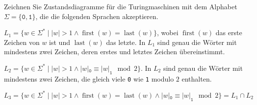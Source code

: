 Zeichnen Sie Zustandsdiagramme für die Turingmaschinen
mit dem Alphabet $\Sigma=\{\texttt{0},\texttt{1}\}$, die die folgenden
Sprachen akzeptieren.
\begin{teilaufgaben}
\item
\(
L_1
=
\{ w\in\Sigma^*
\;|\;
|w| > 1
\wedge
\operatorname{first}(w) = \operatorname{last}(w)
\}
\),
wobei $\operatorname{first}(w)$ das erste Zeichen von $w$
ist und $\operatorname{last}(w)$ das letzte.
In $L_1$ sind genau die Wörter mit mindestens zwei Zeichen, deren erstes und
letztes Zeichen übereinstimmt.
\item
\(
L_2
=
\{ w\in\Sigma^*
\;|\;
|w| > 1
\wedge
|w|_{\texttt{0}} \equiv |w|_{\texttt{1}} \mod 2
\}
\).
In $L_2$ sind genau die Wörter mit mindestens zwei Zeichen, 
die gleich viele \texttt{0} wie \texttt{1} modulo $2$ enthalten.
\item
\(
L_3
=
\{ w\in\Sigma^*
\;|\;
|w| > 1
\wedge
\operatorname{first}(w) = \operatorname{last}(w)
\wedge
|w|_{\texttt{0}} \equiv |w|_{\texttt{1}} \mod 2
\}
=
L_1\cap L_2
\)
\end{teilaufgaben}

